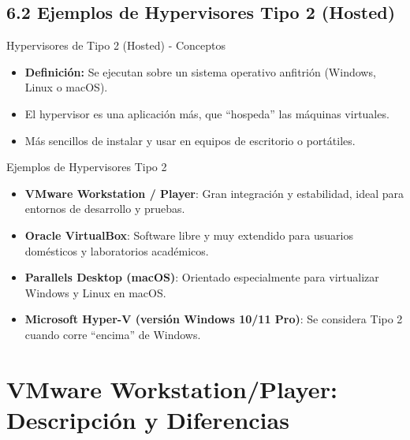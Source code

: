 \documentclass{beamer}
\begin{document}
\subsection{6.2 Ejemplos de Hypervisores Tipo 2 (Hosted)}
\begin{frame}{Hypervisores de Tipo 2 (Hosted) - Conceptos}
    \begin{itemize}
        \item \textbf{Definición:} Se ejecutan sobre un sistema operativo anfitrión (Windows, Linux o macOS).
        \item El hypervisor es una aplicación más, que “hospeda” las máquinas virtuales.
        \item Más sencillos de instalar y usar en equipos de escritorio o portátiles.
    \end{itemize}
\end{frame}

\begin{frame}{Ejemplos de Hypervisores Tipo 2}
    \begin{itemize}
        \item \textbf{VMware Workstation / Player}: Gran integración y estabilidad, ideal para entornos de desarrollo y pruebas.
        \item \textbf{Oracle VirtualBox}: Software libre y muy extendido para usuarios domésticos y laboratorios académicos.
        \item \textbf{Parallels Desktop (macOS)}: Orientado especialmente para virtualizar Windows y Linux en macOS.
        \item \textbf{Microsoft Hyper-V (versión Windows 10/11 Pro)}: Se considera Tipo 2 cuando corre “encima” de Windows.
    \end{itemize}
\end{frame}

\section{VMware Workstation/Player: Descripción y Diferencias}

\end{document}

